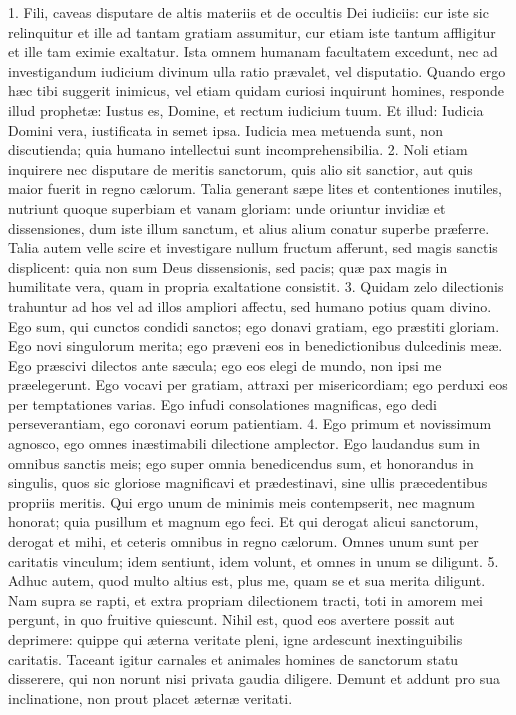 1. Fili, caveas disputare de altis materiis et de occultis Dei iudiciis: cur iste sic relinquitur et ille ad tantam gratiam assumitur, cur etiam iste tantum affligitur et ille tam eximie exaltatur. Ista omnem humanam facultatem excedunt, nec ad investigandum iudicium divinum ulla ratio prævalet, vel disputatio. Quando ergo hæc tibi suggerit inimicus, vel etiam quidam curiosi inquirunt homines, responde illud prophetæ: Iustus es, Domine, et rectum iudicium tuum. Et illud: Iudicia Domini vera, iustificata in semet ipsa. Iudicia mea metuenda sunt, non discutienda; quia humano intellectui sunt incomprehensibilia.
2. Noli etiam inquirere nec disputare de meritis sanctorum, quis alio sit sanctior, aut quis maior fuerit in regno cælorum. Talia generant sæpe lites et contentiones inutiles, nutriunt quoque superbiam et vanam gloriam: unde oriuntur invidiæ et dissensiones, dum iste illum sanctum, et alius alium conatur superbe præferre. Talia autem velle scire et investigare nullum fructum afferunt, sed magis sanctis displicent: quia non sum Deus dissensionis, sed pacis; quæ pax magis in humilitate vera, quam in propria exaltatione consistit.
3. Quidam zelo dilectionis trahuntur ad hos vel ad illos ampliori affectu, sed humano potius quam divino. Ego sum, qui cunctos condidi sanctos; ego donavi gratiam, ego præstiti gloriam. Ego novi singulorum merita; ego præveni eos in benedictionibus dulcedinis meæ. Ego præscivi dilectos ante sæcula; ego eos elegi de mundo, non ipsi me præelegerunt. Ego vocavi per gratiam, attraxi per misericordiam; ego perduxi eos per temptationes varias. Ego infudi consolationes magnificas, ego dedi perseverantiam, ego coronavi eorum patientiam.
4. Ego primum et novissimum agnosco, ego omnes inæstimabili dilectione amplector. Ego laudandus sum in omnibus sanctis meis; ego super omnia benedicendus sum, et honorandus in singulis, quos sic gloriose magnificavi et prædestinavi, sine ullis præcedentibus propriis meritis. Qui ergo unum de minimis meis contempserit, nec magnum honorat; quia pusillum et magnum ego feci. Et qui derogat alicui sanctorum, derogat et mihi, et ceteris omnibus in regno cælorum. Omnes unum sunt per caritatis vinculum; idem sentiunt, idem volunt, et omnes in unum se diligunt.
5. Adhuc autem, quod multo altius est, plus me, quam se et sua merita diligunt. Nam supra se rapti, et extra propriam dilectionem tracti, toti in amorem mei pergunt, in quo fruitive quiescunt. Nihil est, quod eos avertere possit aut deprimere: quippe qui æterna veritate pleni, igne ardescunt inextinguibilis caritatis. Taceant igitur carnales et animales homines de sanctorum statu disserere, qui non norunt nisi privata gaudia diligere. Demunt et addunt pro sua inclinatione, non prout placet æternæ veritati.
